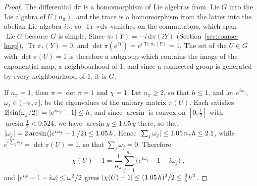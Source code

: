 \documentclass[11pt]{preprint}
\newcommand{\dd}{\mathrm{d}}
\DeclarePairedDelimiter{\abs}{\lvert}{\rvert}
\numberwithin{equation}{section}
\theoremstyle{definition}
\theoremstyle{remark}
\theoremstyle{plain}
\begin{document}
\begin{proof}
The differential $\dd\pi$ is a homomorphism of Lie algebras from $\operatorname{Lie}G$ into the Lie algebra of $U(n_\pi)$, and the trace is a homomorphism from the latter into the abelian Lie algebra $i\mathbb R$; so $\operatorname{Tr}\circ\dd\pi$ vanishes on the commutators, which span $\operatorname{Lie}G$ because $G$ is simple. Since $\pi_*(Y) = -i\,\dd\pi(iY)$ (Section~\ref{sec:coarse-loop}), $\operatorname{Tr}\pi_*(Y) = 0$, and $\det\pi(e^{iY}) = e^{i\operatorname{Tr}\pi_*(Y)} = 1$. The set of the $U \in G$ with $\det\pi(U) = 1$ is therefore a subgroup which contains the image of the exponential map, a neighbourhood of $1$, and since a connected group is generated by every neighbourhood of $1$, it is $G$.

If $n_\pi = 1$, then $\pi = \det\pi = 1$ and $\chi = 1$. Let $n_\pi \geq 2$, so that $h \leq 1$, and let $e^{i\omega_j}$, $\omega_j \in (-\pi, \pi]$, be the eigenvalues of the unitary matrix $\pi(U)$. Each satisfies $2\abs{\sin(\omega_j/2)} = \abs{e^{i\omega_j} - 1} \leq h$, and since $\arcsin$ is convex on $[0, \frac12]$ with $\arcsin\frac12 < 0.524$, we have $\arcsin y \leq 1.05\,y$ there, so that $\abs{\omega_j} = 2\arcsin(\abs{e^{i\omega_j} - 1}/2) \leq 1.05\,h$. Hence $\abs{\sum_j\omega_j} \leq 1.05\,n_\pi h \leq 2.1$, while $e^{i\sum_j\omega_j} = \det\pi(U) = 1$, so that $\sum_j\omega_j = 0$. Therefore
\begin{equation}\label{eq:near-one-sum}
    \chi(U) - 1 = \frac{1}{n_\pi}\sum_{j=1}^{n_\pi}\bigl(e^{i\omega_j} - 1 - i\omega_j\bigr)\;,
\end{equation}
and $\abs{e^{i\omega} - 1 - i\omega} \leq \omega^2/2$ gives $\abs{\chi(U) - 1} \leq (1.05\,h)^2/2 \leq \frac35h^2$.
\end{proof}
\end{document}
